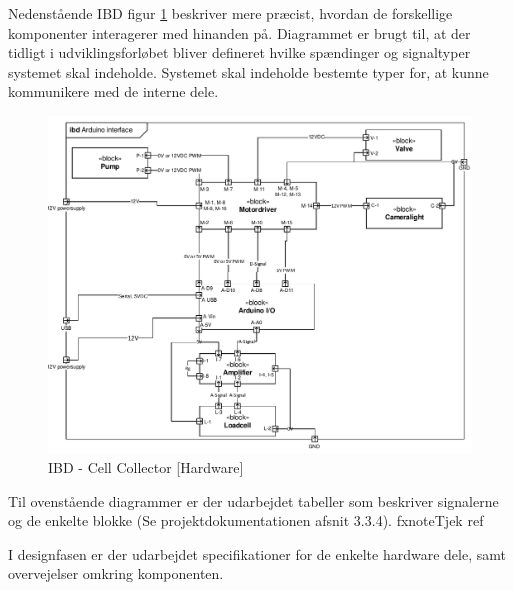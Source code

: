 Nedenstående IBD figur \ref{fig:ibd_Hardware} beskriver mere præcist, hvordan de forskellige komponenter interagerer med hinanden på. Diagrammet er brugt til, at der tidligt i udviklingsforløbet bliver defineret hvilke spændinger og signaltyper systemet skal indeholde. Systemet skal indeholde bestemte typer for, at kunne kommunikere med de interne dele.


\begin{figure}[H]
	\centering
	\includegraphics[width=1\textwidth]{pdf/IBD_Hardware(Arduino).pdf}
	\caption{IBD - Cell Collector [Hardware]}
	\label{fig:ibd_Hardware}
\end{figure}

Til ovenstående diagrammer er der udarbejdet tabeller som beskriver signalerne og de enkelte blokke (Se projektdokumentationen afsnit 3.3.4). fxnote{Tjek ref}

I designfasen er der udarbejdet specifikationer for de enkelte hardware dele, samt overvejelser omkring komponenten. 
\newpage
